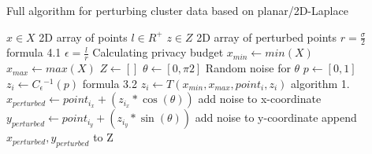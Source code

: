 \begin{algorithm}[h]
  \caption{Full algorithm for perturbing cluster data based on planar/2D-Laplace \citep{DBLP:journals/corr/abs-1212-1984}}\label{alg:rq1}
  \begin{algorithmic}
    \Require $x \in X$  \Comment 2D array of points
    \Require $l \in R^ +$
    \Ensure $z \in Z$ \Comment 2D array of perturbed points
    \State $r = \frac{\sigma}{2}$ \Comment formula 4.1
    \State $\epsilon = \frac{l}{r}$ \Comment Calculating privacy budget \citep{DBLP:journals/corr/abs-1212-1984}
    \State $x_{min} \gets min(X)$
    \State $x_{max} \gets max(X)$
    \State $Z \gets []$
    \State $\theta \gets [0, \pi2]$       \Comment Random noise for $\theta$
    \State $p \gets [0, 1]$
    \State $z_i \gets C{_\epsilon}{^{-1}}(p)$       \Comment formula 3.2
    \State $z_i \gets T(x_{min}, x_{max}, point_i, z_i)$ \Comment algorithm 1.
    \State $x_{perturbed} \gets point_{i_x} + (z_{i_x} * \cos(\theta)) $ \Comment add noise to x-coordinate
    \State $y_{perturbed} \gets point_{i_y} + (z_{i_y} * \sin(\theta)) $ \Comment add noise to y-coordinate
    \State append $x_{perturbed}, y_{perturbed}$ to Z
    \EndFor
  \end{algorithmic}
\end{algorithm}